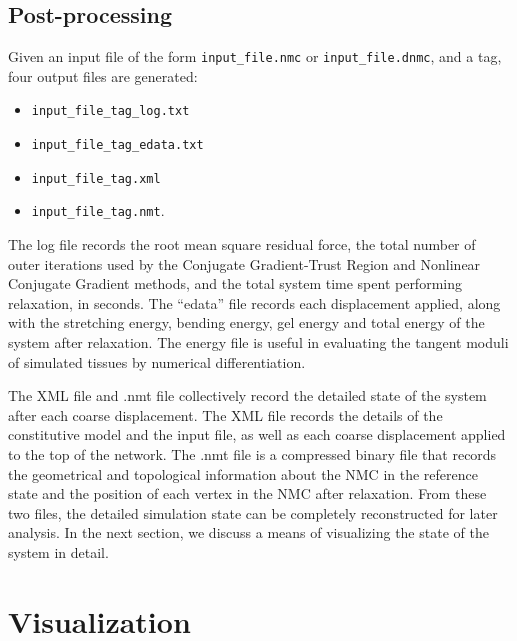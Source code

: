 \documentclass{article}
\begin{document}
\subsection{Post-processing}
Given an input file of the form \texttt{input\_file.nmc} or 
\texttt{input\_file.dnmc}, and a tag, four output files are generated:
\begin{itemize}
\item \texttt{input\_file\_tag\_log.txt}
\item \texttt{input\_file\_tag\_edata.txt}
\item \texttt{input\_file\_tag.xml}
\item \texttt{input\_file\_tag.nmt}.
\end{itemize}
The log file records the root mean square residual force, the total number of 
outer iterations used by the Conjugate Gradient-Trust Region and Nonlinear
Conjugate Gradient methods, and the total system time spent performing 
relaxation, in seconds. The ``edata'' file records each displacement applied, 
along with the stretching energy, bending energy, gel energy and total energy of
the system after relaxation. The energy file is useful in evaluating the
tangent moduli of simulated tissues by numerical differentiation.

The XML file and .nmt file collectively record the detailed state of the
system after each coarse displacement. The XML file records the details of
the constitutive model and the input file, as well as each coarse displacement
applied to the top of the network. The .nmt file is a compressed binary file
that records the geometrical and topological information about the NMC in the
reference state and the position of each vertex in the NMC after relaxation.
From these two files, the detailed simulation state can be completely 
reconstructed for later analysis. In the next section, we discuss a means of
visualizing the state of the system in detail.

\section{Visualization}
\end{document}
